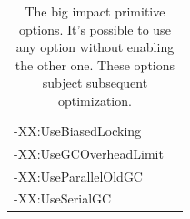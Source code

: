 \documentclass[
  digital, %
  oneside,
  notable, %
  nolof,     %
  nolot     %
]{fithesis3}
\begin{document}
\begin{table}[]
\begin{tabular}{ll}
	\multicolumn{1}{|l|}{-XX:UseBiasedLocking}                       &                                                             \\ \cline{1-1}
	\multicolumn{1}{|l|}{-XX:UseGCOverheadLimit}                     &                                                             \\ \cline{1-1}
	\multicolumn{1}{|l|}{-XX:UseParallelOldGC}                       &                                                             \\ \cline{1-1}
	\multicolumn{1}{|l|}{-XX:UseSerialGC}                            &                                                             \\ \cline{1-1}
	\end{tabular}
	\caption{The big impact primitive options. It's possible to use any option without enabling the other one. These options subject subsequent optimization.}
	\label{bigimpactprimitive}
\end{table}
	
	
	
\end{document}
